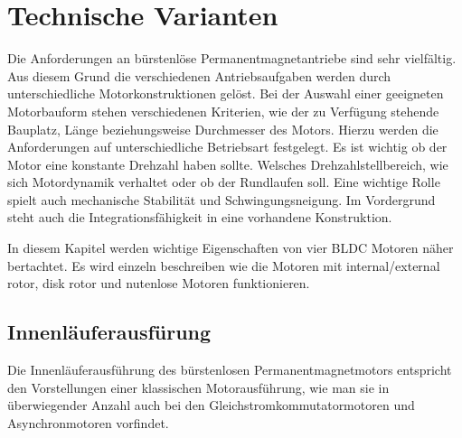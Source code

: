 \chapter{Technische Varianten}
Die Anforderungen an bürstenlöse Permanentmagnetantriebe sind sehr vielfältig. Aus diesem Grund die verschiedenen Antriebsaufgaben werden durch unterschiedliche Motorkonstruktionen gelöst.
Bei der Auswahl einer geeigneten Motorbauform stehen verschiedenen Kriterien, wie der zu Verfügung stehende Bauplatz, Länge beziehungsweise Durchmesser des Motors. Hierzu werden die Anforderungen auf unterschiedliche Betriebsart festgelegt. Es ist wichtig ob der Motor eine konstante Drehzahl haben sollte. Welsches Drehzahlstellbereich, wie sich Motordynamik verhaltet oder ob der Rundlaufen soll. Eine wichtige Rolle spielt auch mechanische Stabilität und Schwingungsneigung. Im Vordergrund steht auch die Integrationsfähigkeit in eine vorhandene Konstruktion.\parencite[S. 74]{Stölting2011}

In diesem Kapitel werden wichtige Eigenschaften von vier BLDC Motoren näher bertachtet. Es wird einzeln beschreiben wie die Motoren mit internal/external rotor, disk rotor und nutenlose Motoren funktionieren.
\section{Innenläuferausfürung}
Die Innenläuferausführung des bürstenlosen Permanentmagnetmotors entspricht den Vorstellungen einer klassischen Motorausführung, wie man sie in überwiegender Anzahl auch bei den Gleichstromkommutatormotoren und Asynchronmotoren vorfindet.

